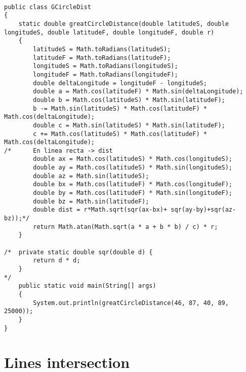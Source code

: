 \documentclass[a4paper, 11pt, oneside]{report}
\begin{document}
\begin{verbatim}

public class GCircleDist
{
	static double greatCircleDistance(double latitudeS, double longitudeS, double latitudeF, double longitudeF, double r)
	{
		latitudeS = Math.toRadians(latitudeS);
		latitudeF = Math.toRadians(latitudeF);
		longitudeS = Math.toRadians(longitudeS);
		longitudeF = Math.toRadians(longitudeF);
		double deltaLongitude = longitudeF - longitudeS;
		double a = Math.cos(latitudeF) * Math.sin(deltaLongitude);
		double b = Math.cos(latitudeS) * Math.sin(latitudeF);
		b -= Math.sin(latitudeS) * Math.cos(latitudeF) * Math.cos(deltaLongitude);
		double c = Math.sin(latitudeS) * Math.sin(latitudeF);
		c += Math.cos(latitudeS) * Math.cos(latitudeF) * Math.cos(deltaLongitude);
/*      En linea recta -> dist
        double ax = Math.cos(latitudeS) * Math.cos(longitudeS);
        double ay = Math.cos(latitudeS) * Math.sin(longitudeS);
        double az = Math.sin(latitudeS);
        double bx = Math.cos(latitudeF) * Math.cos(longitudeF);
        double by = Math.cos(latitudeF) * Math.sin(longitudeF); 
        double bz = Math.sin(latitudeF);
        double dist = r*Math.sqrt(sqr(ax-bx)+ sqr(ay-by)+sqr(az-bz));*/
		return Math.atan(Math.sqrt(a * a + b * b) / c) * r;
	}
	
/*	private static double sqr(double d) {
		return d * d;
	}
*/
	public static void main(String[] args)
	{
		System.out.println(greatCircleDistance(46, 87, 40, 89, 25000));
	}
}

\end{verbatim}

\section{Lines intersection}
\end{document}
